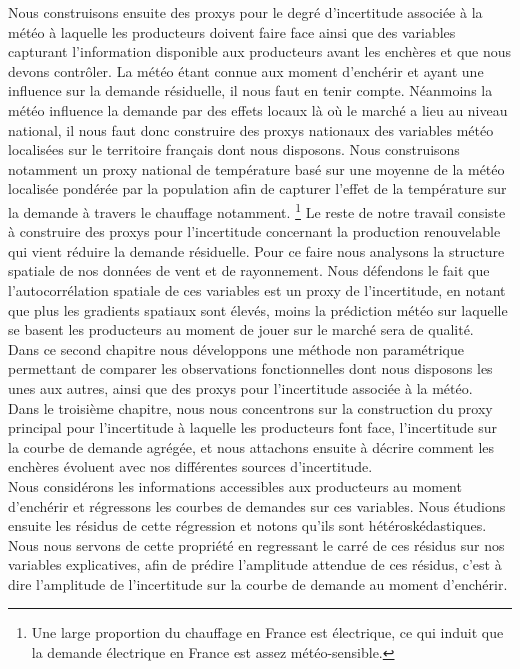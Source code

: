 Nous construisons ensuite des proxys pour le degré d'incertitude associée à la météo à laquelle les producteurs doivent faire face ainsi que des variables capturant l'information disponible aux producteurs avant les enchères et que nous devons contrôler. La météo étant connue aux moment d'enchérir et ayant une influence sur la demande résiduelle, il nous faut en tenir compte. Néanmoins la météo influence la demande par des effets locaux là où le marché a lieu au niveau national, il nous faut donc construire des proxys nationaux des variables météo localisées sur le territoire français dont nous disposons. Nous construisons notamment un proxy national de température basé sur une moyenne de la météo localisée pondérée par la population afin de capturer l'effet de la température sur la demande à travers le chauffage notamment. \footnote{Une large proportion du chauffage en France est électrique, ce qui induit que la demande électrique en France est assez météo-sensible.} Le reste de notre travail consiste à construire des proxys pour l'incertitude concernant la production renouvelable qui vient réduire la demande résiduelle. Pour ce faire nous analysons la structure spatiale de nos données de vent et de rayonnement. Nous défendons le fait que l'autocorrélation spatiale de ces variables est un proxy de l'incertitude, en notant que plus les gradients spatiaux sont élevés, moins la prédiction météo sur laquelle se basent les producteurs au moment de jouer sur le marché sera de qualité.\\

Dans ce second chapitre nous développons une méthode non paramétrique permettant de comparer les observations fonctionnelles dont nous disposons les unes aux autres, ainsi que des proxys pour l'incertitude associée à la météo.\\

Dans le troisième chapitre, nous nous concentrons sur la construction du proxy principal pour l'incertitude à laquelle les producteurs font face, l'incertitude sur la courbe de demande agrégée, et nous attachons ensuite à décrire comment les enchères évoluent avec nos différentes sources d'incertitude.\\

Nous considérons les informations accessibles aux producteurs au moment d'enchérir et régressons les courbes de demandes sur ces variables. Nous étudions ensuite les résidus de cette régression et notons qu'ils sont hétéroskédastiques. Nous nous servons de cette propriété en regressant le carré de ces résidus sur nos variables explicatives, afin de prédire l'amplitude attendue de ces résidus, c'est à dire l'amplitude de l'incertitude sur la courbe de demande au moment d'enchérir.\\

